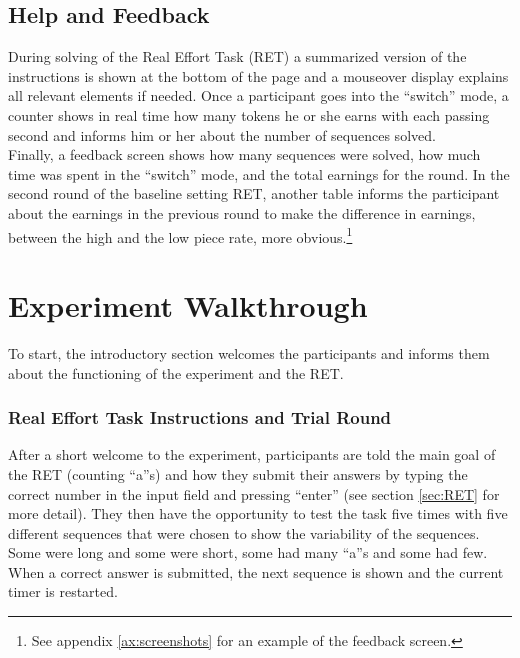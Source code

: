     \subsection{Help and Feedback}
    
    During solving of the Real Effort Task (RET) a summarized version of the instructions is shown at the bottom of the page and a mouseover display explains all relevant elements if needed. Once a participant goes into the ``switch'' mode, a counter shows in real time how many tokens he or she earns with each passing second and informs him or her about the number of sequences solved.\\
    
    Finally, a feedback screen shows how many sequences were solved, how much time was spent in the ``switch'' mode, and the total earnings for the round. In the second round of the baseline setting RET, another table informs the participant about the earnings in the previous round to make the difference in earnings, between the high and the low piece rate, more obvious.\footnote{See appendix \ref{ax:screenshots} for an example of the feedback screen.}
    
    \section{Experiment Walkthrough}
    \label{sec:intro_exp}
    
    To start, the introductory section welcomes the participants and informs them about the functioning of the experiment and the RET.
    
    \subsubsection{Real Effort Task Instructions and Trial Round}
    
    After a short welcome to the experiment, participants are told the main goal of the RET (counting ``a''s) and how they submit their answers by typing the correct number in the input field and pressing ``enter'' (see section \ref{sec:RET} for more detail). They then have the opportunity to test the task five times with five different sequences that were chosen to show the variability of the sequences. Some were long and some were short, some had many ``a''s and some had few. When a correct answer is submitted, the next sequence is shown and the current timer is restarted. \\
    
